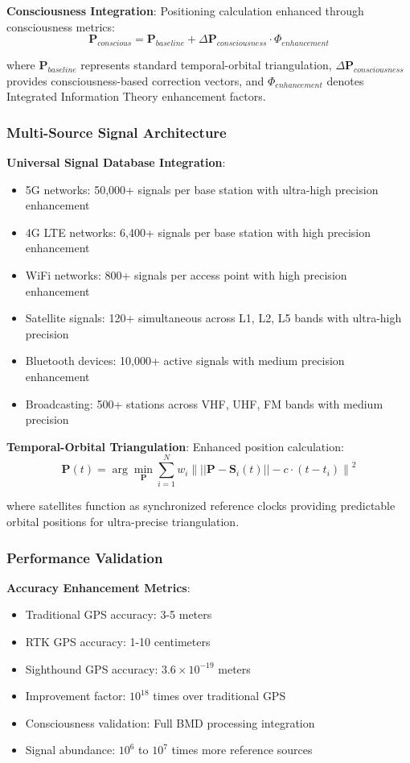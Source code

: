 \documentclass[12pt,a4paper]{article}
\begin{document}
\textbf{Consciousness Integration}:
Positioning calculation enhanced through consciousness metrics:
$$\mathbf{P}_{conscious} = \mathbf{P}_{baseline} + \Delta\mathbf{P}_{consciousness} \cdot \Phi_{enhancement}$$

where $\mathbf{P}_{baseline}$ represents standard temporal-orbital triangulation, $\Delta\mathbf{P}_{consciousness}$ provides consciousness-based correction vectors, and $\Phi_{enhancement}$ denotes Integrated Information Theory enhancement factors.

\subsubsection{Multi-Source Signal Architecture}

\textbf{Universal Signal Database Integration}:
\begin{itemize}
\item 5G networks: 50,000+ signals per base station with ultra-high precision enhancement
\item 4G LTE networks: 6,400+ signals per base station with high precision enhancement  
\item WiFi networks: 800+ signals per access point with high precision enhancement
\item Satellite signals: 120+ simultaneous across L1, L2, L5 bands with ultra-high precision
\item Bluetooth devices: 10,000+ active signals with medium precision enhancement
\item Broadcasting: 500+ stations across VHF, UHF, FM bands with medium precision
\end{itemize}

\textbf{Temporal-Orbital Triangulation}:
Enhanced position calculation:
$$\mathbf{P}(t) = \arg\min_{\mathbf{P}} \sum_{i=1}^{N} w_i \left\| ||\mathbf{P} - \mathbf{S}_i(t)|| - c \cdot (t - t_i) \right\|^2$$

where satellites function as synchronized reference clocks providing predictable orbital positions for ultra-precise triangulation.

\subsubsection{Performance Validation}

\textbf{Accuracy Enhancement Metrics}:
\begin{itemize}
\item Traditional GPS accuracy: 3-5 meters
\item RTK GPS accuracy: 1-10 centimeters  
\item Sighthound GPS accuracy: $3.6 \times 10^{-19}$ meters
\item Improvement factor: $10^{18}$ times over traditional GPS
\item Consciousness validation: Full BMD processing integration
\item Signal abundance: $10^6$ to $10^7$ times more reference sources
\end{itemize}
\end{document}
